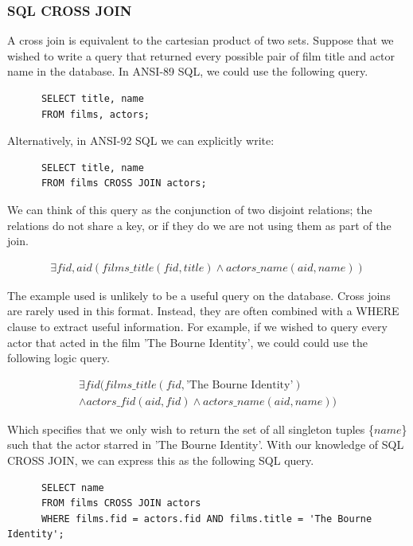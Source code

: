 \documentclass[a4paper, 11pt]{article}
\begin{document}
    \subsubsection{SQL CROSS JOIN}

      A cross join is equivalent to the cartesian product of two sets. Suppose
      that we wished to write a query that returned every possible pair of
      film title and actor name in the database. In ANSI-89 SQL, we could use 
      the following query.

      \begin{verbatim}
      SELECT title, name
      FROM films, actors;
      \end{verbatim}

      Alternatively, in ANSI-92 SQL we can explicitly write:

      \begin{verbatim}
      SELECT title, name
      FROM films CROSS JOIN actors;
      \end{verbatim}

      We can think of this query as the conjunction of two disjoint relations;
      the relations do not share a key, or if they do we are not using them as
      part of the join.

      \begin{gather}
        \exists fid, aid(films\_title(fid, title) \land actors\_name(aid, name))
      \end{gather}

      The example used is unlikely to be a useful query on the database. Cross
      joins are rarely used in this format. Instead, they are often combined
      with a WHERE clause to extract useful information. For example, if we
      wished to query every actor that acted in the film 'The Bourne Identity',
      we could could use the following logic query.

      \begin{gather}
        \exists fid(films\_title(fid, \text{'The Bourne Identity'}) \nonumber\\
        \land actors\_fid(aid, fid) \land actors\_name(aid, name))
      \end{gather}

      Which specifies that we only wish to return the set of all singleton
      tuples \{$name$\} such that the actor starred in 'The Bourne Identity'.
      With our knowledge of SQL CROSS JOIN, we can express this as the
      following SQL query.

      \begin{verbatim}
      SELECT name
      FROM films CROSS JOIN actors
      WHERE films.fid = actors.fid AND films.title = 'The Bourne Identity';
      \end{verbatim}
\end{document}
